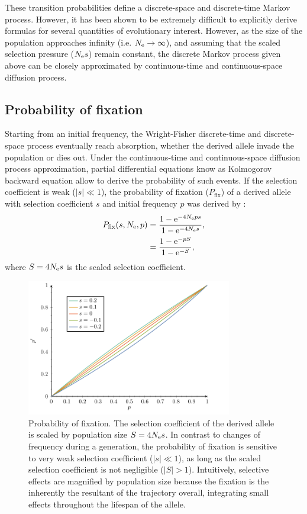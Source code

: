 These {transition} probabilities define a discrete-space and discrete-time Markov process.
However, it has been shown to be extremely difficult to explicitly derive formulas for several quantities of evolutionary interest.
However, as the size of the population approaches infinity (i.e. $ N_{\textrm{e}} \to \infty$), and assuming that the scaled selection pressure ($N_{\textrm{e}} s $) remain constant, the discrete Markov process given above can be closely approximated by continuous-time and continuous-space diffusion process.\\

\subsection{Probability of fixation}
Starting from an initial frequency, the Wright-Fisher discrete-time and discrete-space process eventually reach absorption, whether the derived \gls{allele} invade the population or dies out. 
Under the continuous-time and continuous-space diffusion process approximation, partial differential equations know as Kolmogorov backward equation allow to derive the probability of such events. 
If the selection coefficient is weak ($|s| \ll 1$), the probability of fixation ($P_{\mathrm{fix}}$) of a derived \gls{allele} with selection coefficient $s$ and initial frequency $p$ was derived by \citet{Kimura1962}:
\begin{align}
P_{\mathrm{fix}}(s, N_{\textrm{e}}, p) & = \dfrac{1 - \mathrm{e}^{-4 N_{\textrm{e}} p s }}{1 - \mathrm{e}^{-4 N_{\textrm{e}} s}},\\
			     & = \dfrac{1 - \mathrm{e}^{- p S }}{1 - \mathrm{e}^{-S}},
\end{align}
where $S = 4 N_{\textrm{e}} s$ is the scaled selection coefficient.
\begin{figure}[H]
	\begin{center}
		\includegraphics[width=0.8\textwidth, page=3] {figures.pdf}
	\end{center}
	\caption[Probability of fixation]{Probability of fixation. The selection coefficient of the derived \gls{allele} is scaled by population size $S=4 N_{\textrm{e}} s$. In contrast to changes of frequency during a generation, the probability of fixation is sensitive to very weak selection coefficient ($|s| \ll 1$), as long as the scaled selection coefficient is not negligible ($|S| > 1$). Intuitively, selective effects are magnified by population size because the fixation is the inherently the resultant of the trajectory overall, integrating small effects throughout the lifespan of the \gls{allele}. }
\end{figure}

